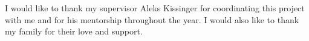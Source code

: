 \begin{acknowledgements}
  I would like to thank my supervisor Aleks Kissinger for coordinating this project with me and for his mentorship throughout the year.
  I would also like to thank my family for their love and support.
\end{acknowledgements}
